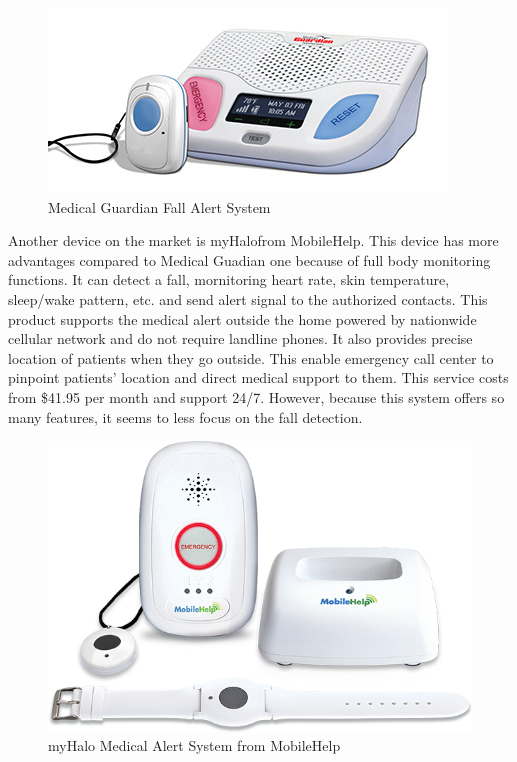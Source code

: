 \documentclass[letterpaper,12pt,titlepage,oneside,final]{book}
\begin{document}
 \begin{figure}[h!]
	\centering
	\includegraphics[scale=0.7]{medical-guardian-fall-alert-system}
	\caption{Medical Guardian Fall Alert System}
\end{figure}
  
Another device on the market is myHalo\texttrademark from MobileHelp\texttrademark. This device has more advantages compared to Medical Guadian one because of full body monitoring functions. It can detect a fall, mornitoring heart rate, skin temperature, sleep/wake pattern, etc. and send alert signal to the authorized contacts. This product supports the medical alert outside the home powered by nationwide cellular network and do not require landline phones. It also provides precise location of patients when they go outside. This enable emergency call center to pinpoint patients' location and direct medical support to them. This service costs from \$41.95 per month and support 24/7. However, because this system offers so many features, it seems to less focus on the fall detection. 

 \begin{figure}[h!]
	\centering
	\includegraphics[scale=0.5]{mobile-help}
	\caption{myHalo Medical Alert System from MobileHelp\texttrademark}
\end{figure}
\end{document}
